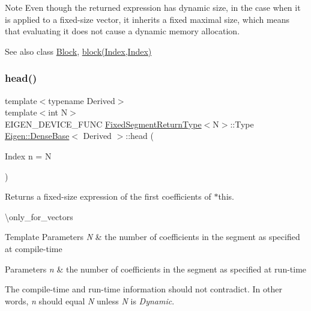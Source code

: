 \begin{DoxyNote}{Note}
Even though the returned expression has dynamic size, in the case when it is applied to a fixed-\/size vector, it inherits a fixed maximal size, which means that evaluating it does not cause a dynamic memory allocation.
\end{DoxyNote}
\begin{DoxySeeAlso}{See also}
class \mbox{\hyperlink{class_eigen_1_1_block}{Block}}, \mbox{\hyperlink{class_eigen_1_1_dense_base_adfadb0b888358ae1f521cc0a106ddb85}{block(\+Index,\+Index)}} 
\end{DoxySeeAlso}
\mbox{\label{class_eigen_1_1_dense_base_a1acca94af7eeb14807e9637420adcaf1}} 
\subsubsection{\texorpdfstring{head()}{head()}\hspace{0.1cm}{\footnotesize\ttfamily [2/2]}}
{\footnotesize\ttfamily template$<$typename Derived$>$ \\
template$<$int N$>$ \\
E\+I\+G\+E\+N\+\_\+\+D\+E\+V\+I\+C\+E\+\_\+\+F\+U\+NC \mbox{\hyperlink{struct_eigen_1_1_dense_base_1_1_fixed_segment_return_type}{Fixed\+Segment\+Return\+Type}}$<$N$>$\+::Type \mbox{\hyperlink{class_eigen_1_1_dense_base}{Eigen\+::\+Dense\+Base}}$<$ Derived $>$\+::head (\begin{DoxyParamCaption}\item[{Index}]{n = {\ttfamily N} }\end{DoxyParamCaption})\hspace{0.3cm}{\ttfamily [inline]}}

\begin{DoxyReturn}{Returns}
a fixed-\/size expression of the first coefficients of $\ast$this.
\end{DoxyReturn}
\textbackslash{}only\+\_\+for\+\_\+vectors


\begin{DoxyTemplParams}{Template Parameters}
{\em N} & the number of coefficients in the segment as specified at compile-\/time \\
\hline
\end{DoxyTemplParams}

\begin{DoxyParams}{Parameters}
{\em n} & the number of coefficients in the segment as specified at run-\/time\\
\hline
\end{DoxyParams}
The compile-\/time and run-\/time information should not contradict. In other words, {\itshape n} should equal {\itshape N} unless {\itshape N} is {\itshape Dynamic}.

